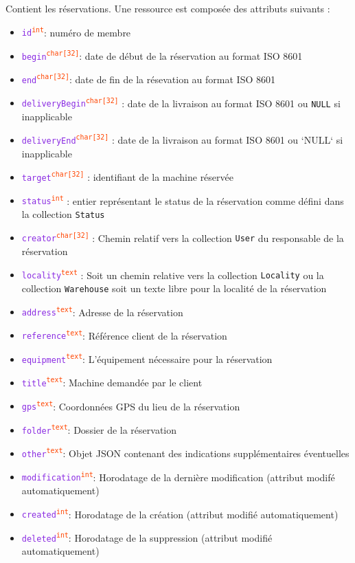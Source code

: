 \documentclass[a4paper,twoside]{article}
\newcommand{\collection}[1]{\colorbox{light-gray}{\texttt{#1}}}
\newcommand{\attribut}[1]{\textcolor{BlueViolet}{\texttt{#1}}}
\newcommand{\type}[1]{\textcolor{OrangeRed}{\textsuperscript{\texttt{#1}}}}
\begin{document}
Contient les réservations. Une ressource est composée des attributs suivants :

\begin{itemize}
  \item \attribut{id}\type{int}: numéro de membre
  \item \attribut{begin}\type{char[32]}: date de début de la réservation au format ISO 8601
  \item \attribut{end}\type{char[32]}: date de fin de la résevation au format ISO 8601
  \item \attribut{deliveryBegin}\type{char[32]} : date de la livraison au format ISO 8601 ou \texttt{NULL} si inapplicable
  \item \attribut{deliveryEnd}\type{char[32]} : date de la livraison au format ISO 8601 ou `NULL` si inapplicable
  \item \attribut{target}\type{char[32]} : identifiant de la machine réservée
  \item \attribut{status}\type{int} : entier représentant le status de la réservation comme défini dans la collection \collection{Status}
  \item \attribut{creator}\type{char[32]} : Chemin relatif vers la collection \collection{User} du responsable de la réservation
  \item \attribut{locality}\type{text} : Soit un chemin relative vers la collection \collection{Locality} ou la collection \collection{Warehouse} soit un texte libre pour la localité de la réservation
  \item \attribut{address}\type{text}: Adresse de la réservation
  \item \attribut{reference}\type{text}: Référence client de la réservation
  \item \attribut{equipment}\type{text}: L'équipement nécessaire pour la réservation
  \item \attribut{title}\type{text}: Machine demandée par le client
  \item \attribut{gps}\type{text}: Coordonnées GPS du lieu de la réservation
  \item \attribut{folder}\type{text}: Dossier de la réservation
  \item \attribut{other}\type{text}: Objet JSON contenant des indications supplémentaires éventuelles
  \item \attribut{modification}\type{int}: Horodatage de la dernière modification (attribut modifé automatiquement)
  \item \attribut{created}\type{int}: Horodatage de la création (attribut modifié automatiquement)
  \item \attribut{deleted}\type{int}: Horodatage de la suppression (attribut modifié automatiquement)
\end{itemize}
\end{document}
